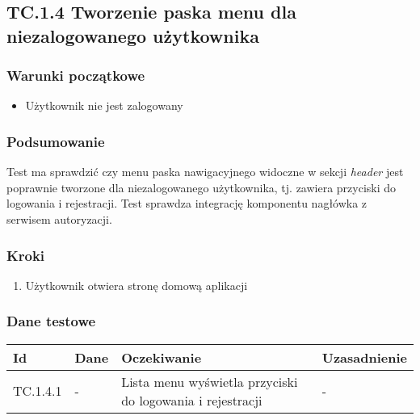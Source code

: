 \documentclass[a4paper,15pt]{article}
\begin{document}
\newpage
\begin{framed}
\subsection{TC.1.4 Tworzenie paska menu dla niezalogowanego użytkownika}

\vspace{0.5cm}

\subsubsection{Warunki początkowe}
\begin{itemize}
\item Użytkownik nie jest zalogowany
\end{itemize}

\subsubsection{Podsumowanie}
Test ma sprawdzić czy menu paska nawigacyjnego widoczne w sekcji \textit{header} jest poprawnie tworzone dla niezalogowanego użytkownika, tj. zawiera przyciski do logowania i rejestracji. Test sprawdza integrację komponentu nagłówka z serwisem autoryzacji. 

\subsubsection{Kroki}
\begin{enumerate}
\item Użytkownik otwiera stronę domową aplikacji
\end{enumerate}

\subsubsection{Dane testowe}

\begin{center}
\begin{tabular}{ |C{1.5cm}|C{3cm}|C{4cm}|C{4cm}| } 
 \hline
 \textbf{Id} & \textbf{Dane} & \textbf{Oczekiwanie} & \textbf{Uzasadnienie} \\ \hline
 TC.1.4.1 & - & Lista menu wyświetla przyciski do logowania i rejestracji & - \\ \hline
\end{tabular}
\end{center}

\end{framed}
\end{document}
